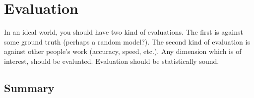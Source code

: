 \chapter{Evaluation}

In an ideal world, you should have two kind of evaluations. The first is against some ground truth (perhaps a random model?). The second kind of evaluation is against other people's work (accuracy, speed, etc.). Any dimension which is of interest, should be evaluated.  Evaluation should be statistically sound.

\blindtext

\section{Summary}
\blindtext